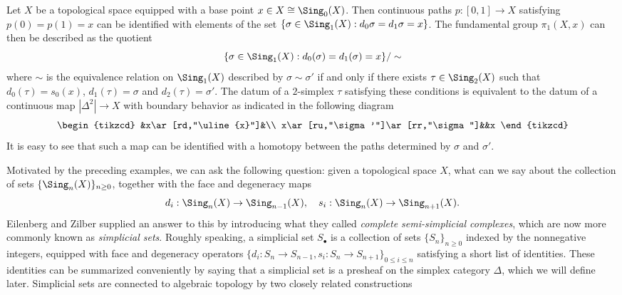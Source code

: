 \begin{example}\label{simplicial set pi_1 from Sing}
Let $X$ be a topological space equipped with a base point $x\in X\cong\Sing_0(X)$. Then continuous paths $p:[0,1]\to X$ satisfying $p(0)=p(1)=x$ can be identified with elements of the set $\{\sigma\in\Sing_1(X):d_0\sigma=d_1\sigma=x\}$. The fundamental group $\pi_1(X,x)$ can then be described as the quotient
\[\{\sigma\in\Sing_1(X):d_0(\sigma)=d_1(\sigma)=x\}/\sim\]
where $\sim$ is the equivalence relation on $\Sing_1(X)$ described by $\sigma\sim\sigma'$ if and only if there exists $\tau\in\Sing_2(X)$ such that $d_0(\tau)=s_0(x)$, $d_1(\tau)=\sigma$ and $d_2(\tau)=\sigma'$. The datum of a $2$-simplex $\tau$ satisfying these conditions is equivalent to the datum of a continuous map $|\Delta^2|\to X$ with boundary behavior as indicated in the following diagram
\[\begin{tikzcd}
&x\ar[rd,"\uline{x}"]&\\
x\ar[ru,"\sigma'"]\ar[rr,"\sigma"]&&x
\end{tikzcd}\]
It is easy to see that such a map can be identified with a homotopy between the paths determined by $\sigma$ and $\sigma'$.
\end{example}
Motivated by the preceding examples, we can ask the following question: given a topological space $X$, what can we say about the collection of sets $\{\Sing_n(X)\}_{n\geq 0}$, together with the face and degeneracy maps
\[d_i:\Sing_n(X)\to\Sing_{n-1}(X),\quad s_i:\Sing_n(X)\to\Sing_{n+1}(X).\]
Eilenberg and Zilber supplied an answer to this by introducing what they called \textit{complete semi-simplicial complexes}, which are now more commonly known as \textit{simplicial sets}. Roughly speaking, a simplicial set $S_\bullet$ is a collection of sets $\{S_n\}_{n\geq 0}$ indexed by the nonnegative integers, equipped with face and degeneracy operators $\{d_i:S_n\to S_{n-1},s_i:S_n\to S_{n+1}\}_{0\leq i\leq n}$ satisfying a short list of identities. These identities can be summarized conveniently by saying that a simplicial set is a presheaf on the simplex category $\Delta$, which we will define later. Simplicial sets are connected to algebraic topology by two closely related constructions
